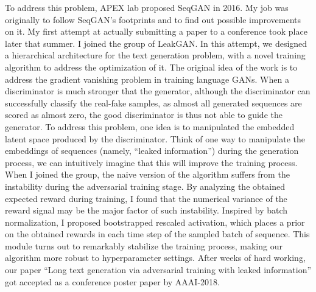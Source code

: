 \documentclass{article}
\begin{document}
      To address this problem, APEX lab proposed SeqGAN in 2016. My job was originally to follow SeqGAN's footprints and to find out possible improvements on it. My first attempt at actually submitting a paper to a conference took place later that summer. I joined the group of LeakGAN. In this attempt, we designed a hierarchical architecture for the text generation problem, with a novel training algorithm to address the optimization of it. The original idea of the work is to address the gradient vanishing problem in training language GANs. When a discriminator is much stronger that the generator, although the discriminator can successfully classify the real-fake samples, as almost all generated sequences are scored as almost zero, the good discriminator is thus not able to guide the generator. To address this problem, one idea is to manipulated the embedded latent space produced by the discriminator. Think of one way to manipulate the embeddings of sequences (namely, ``leaked information'') during the generation process, we can intuitively imagine that this will improve the training process. When I joined the group, the naive version of the algorithm suffers from the instability during the adversarial training stage. By analyzing the obtained expected reward during training, I found that the numerical variance of the reward signal may be the major factor of such instability. Inspired by batch normalization, I proposed bootstrapped rescaled activation, which places a prior on the obtained rewards in each time step of the sampled batch of sequence. This module turns out to remarkably stabilize the training process, making our algorithm more robust to hyperparameter settings. After weeks of hard working, our paper ``Long text generation via adversarial training with leaked information'' got accepted as a conference poster paper by AAAI-2018.
      
\end{document}
